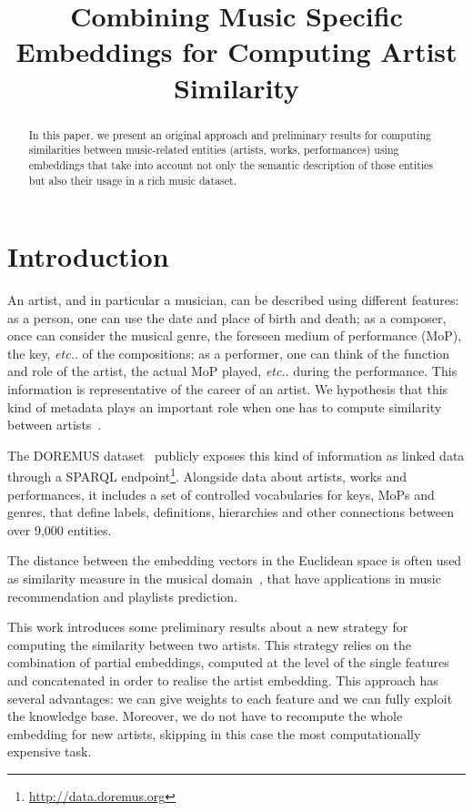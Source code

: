 \documentclass{article}
\title{Combining Music Specific Embeddings for Computing Artist Similarity}
\newcommand{\etc}{\textit{etc.}}
\begin{document}
\maketitle


\begin{abstract}
In this paper, we present an original approach and preliminary results for computing similarities between music-related entities (artists, works, performances) using embeddings that take into account not only the semantic description of those entities but also their usage in a rich music dataset.
\end{abstract}


\section{Introduction}\label{sec:introduction}
An artist, and in particular a musician, can be described using different features: as a person, one can use the date and place of birth and death; as a composer, once can consider the musical genre, the foreseen medium of performance (MoP), the key, \etc. of the compositions; as a performer, one can think of the function and role of the artist, the actual MoP played, \etc. during the performance. This information is representative of the career of an artist. We hypothesis that this kind of metadata plays an important role when one has to compute similarity between artists~\cite{he2017musicalkeys, mcfee09_hesas}.

The DOREMUS dataset~\cite{achichi2015doremus} publicly exposes this kind of information as linked data through a SPARQL endpoint\footnote{\url{http://data.doremus.org}}. Alongside data about artists, works and performances, it includes a set of controlled vocabularies for keys, MoPs and genres, that define labels, definitions, hierarchies and other connections between over 9,000 entities.

The distance between the embedding vectors in the Euclidean space is often used as similarity measure in the musical domain~\cite{moore12learningto, espinosa2017elmdist}, that have applications in music recommendation and playlists prediction.

This work introduces some preliminary results about a new strategy for computing the similarity between two artists. This strategy relies on the combination of partial embeddings, computed at the level of the single features and concatenated in order to realise the artist embedding. This approach has several advantages: we can give weights to each feature and we can fully exploit the knowledge base. Moreover, we do not have to recompute the whole embedding for new artists, skipping in this case the most computationally expensive task.
\end{document}
